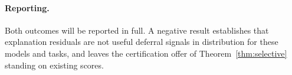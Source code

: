 \documentclass[11pt,letterpaper]{article}
\theoremstyle{plain}
\theoremstyle{definition}
\theoremstyle{remark}
\begin{document}
\paragraph{Reporting.} Both outcomes will be reported in full. A negative result establishes that explanation residuals are not useful deferral signals in distribution for these models and tasks, and leaves the certification offer of Theorem~\ref{thm:selective} standing on existing scores.
\end{document}
